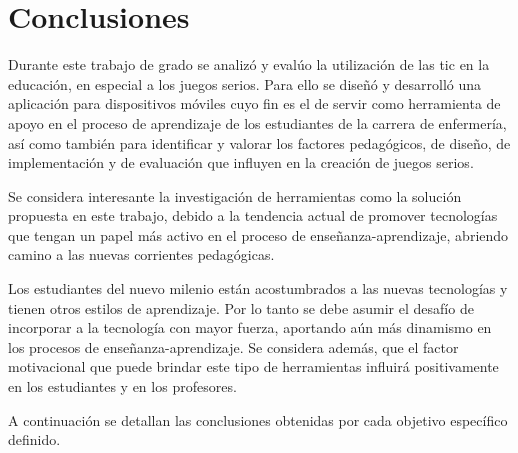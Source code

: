 \chapter{Conclusiones}
\label{chap:conclusion}


Durante este trabajo de grado se analizó y evalúo la utilización de las
\Gls{tic} en la educación, en especial a los juegos serios. Para ello se diseñó
y desarrolló una aplicación para dispositivos móviles cuyo fin es el de servir
como herramienta de apoyo en el proceso de aprendizaje de los estudiantes de la
carrera de enfermería, así como también para identificar y valorar los factores
pedagógicos, de diseño, de implementación y de evaluación que influyen en la
creación de juegos serios.

Se considera interesante la investigación de herramientas como la solución
propuesta en este trabajo, debido a la tendencia actual de promover tecnologías
que tengan un papel más activo en el proceso de enseñanza-aprendizaje, abriendo
camino a las nuevas corrientes pedagógicas. 

Los estudiantes del nuevo milenio están acostumbrados a las nuevas tecnologías y
tienen otros estilos de aprendizaje. Por lo tanto se debe asumir el desafío de
incorporar a la tecnología con mayor fuerza, aportando aún más dinamismo en los
procesos de enseñanza-aprendizaje. Se considera además, que el factor
motivacional que puede brindar este tipo de herramientas influirá positivamente
en los estudiantes y en los profesores.

A continuación se detallan las conclusiones obtenidas por cada objetivo
específico definido.



